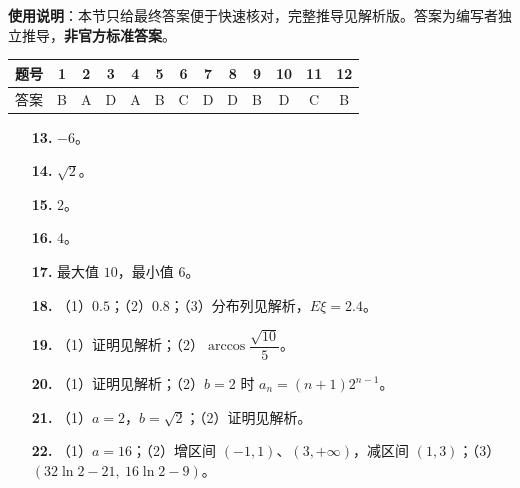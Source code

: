 
\begin{gknotice}
\textbf{使用说明}：本节只给最终答案便于快速核对，完整推导见解析版。答案为编写者独立推导，\textbf{非官方标准答案}。
\end{gknotice}

\begin{center}\begin{tabular}{ccccccccccccc}
\toprule
题号 & 1 & 2 & 3 & 4 & 5 & 6 & 7 & 8 & 9 & 10 & 11 & 12 \\
\midrule
答案 & B & A & D & A & B & C & D & D & B & D & C & B \\
\bottomrule
\end{tabular}\end{center}

\begin{itemize}[leftmargin=2.6em]
  \item[\textbf{13.}] $-6$。
  \item[\textbf{14.}] $\sqrt2$。
  \item[\textbf{15.}] $2$。
  \item[\textbf{16.}] $4$。
\end{itemize}

\begin{itemize}[leftmargin=2.6em]
  \item[\textbf{17.}] 最大值 $10$，最小值 $6$。
  \item[\textbf{18.}] （1）$0.5$；（2）$0.8$；（3）分布列见解析，$E\xi=2.4$。
  \item[\textbf{19.}] （1）证明见解析；（2）$\arccos\dfrac{\sqrt{10}}5$。
  \item[\textbf{20.}] （1）证明见解析；（2）$b=2$ 时 $a_n=(n+1)2^{n-1}$。
  \item[\textbf{21.}] （1）$a=2$，$b=\sqrt2$；（2）证明见解析。
  \item[\textbf{22.}] （1）$a=16$；（2）增区间 $(-1,1)$、$(3,+\infty)$，减区间 $(1,3)$；（3）$\left(32\ln2-21,\ 16\ln2-9\right)$。
\end{itemize}
